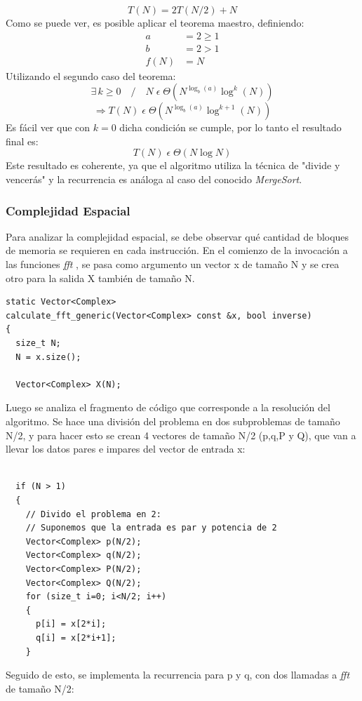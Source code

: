\documentclass{article}
\begin{document}
    \begin{equation*}
      \boxed{T(N) = 2T(N/2) + N}
    \end{equation*}
      Como se puede ver, es posible aplicar el teorema maestro, definiendo:
    \begin{align*}
      a &= 2 \geq 1 \\
      b &= 2 > 1\\
   f(N) &= N
    \end{align*}
      Utilizando el segundo caso del teorema:
    $$ \exists\,k \geq 0 \quad / \quad N \;\epsilon\; \Theta (N^{\log_b (a)} \log^k (N)) $$
    $$ \Rightarrow T(N)\;\epsilon\;\Theta (N^{\log_b (a)} \log^{k+1} (N)) $$
      Es fácil ver que con $k=0$ dicha condición se cumple, por lo tanto
    el resultado final es:
    $$ \boxed{T(N)\;\epsilon\;\Theta (N \log N)} $$
      Este resultado es coherente, ya que el algoritmo utiliza la técnica de 
    "divide y vencerás" y la recurrencia es análoga al caso del conocido 
    \textit{MergeSort}.
\subsubsection{Complejidad Espacial}
  Para analizar la complejidad espacial, se debe observar qué cantidad de bloques de memoria se requieren en cada instrucción.  
En el comienzo de la invocación a las funciones \textit{fft}  , se pasa como argumento un vector x de tamaño N y se crea otro para la salida X también de tamaño N. 
\begin{verbatim}
static Vector<Complex>
calculate_fft_generic(Vector<Complex> const &x, bool inverse)
{
  size_t N;
  N = x.size();

  Vector<Complex> X(N);
\end{verbatim}  
Luego se analiza el fragmento de código que corresponde a la resolución del algoritmo. Se hace una división del problema en dos subproblemas de tamaño N/2, y para hacer esto se crean 4 vectores de tamaño N/2 (p,q,P y Q), que van a llevar los datos pares e impares del vector de entrada x:\\

\begin{verbatim}

  if (N > 1)
  {
    // Divido el problema en 2:
    // Suponemos que la entrada es par y potencia de 2
    Vector<Complex> p(N/2);
    Vector<Complex> q(N/2);
    Vector<Complex> P(N/2);
    Vector<Complex> Q(N/2);
    for (size_t i=0; i<N/2; i++)
    {
      p[i] = x[2*i];
      q[i] = x[2*i+1];
    }
\end{verbatim}
Seguido de esto, se implementa la recurrencia para p y q, con dos llamadas a \textit{fft} de tamaño N/2:
\end{document}
